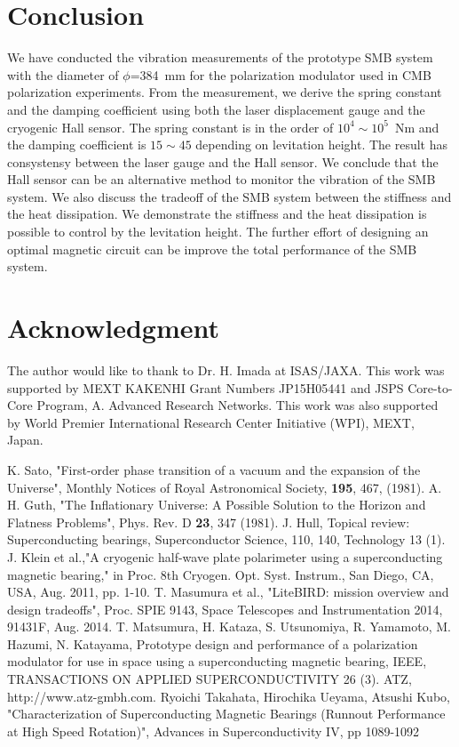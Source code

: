 \documentclass[a4paper]{jpconf}
\begin{document}
\section*{Conclusion}
We have conducted the vibration measurements of the prototype SMB system with the diameter of $\phi$=384~mm for the polarization modulator used in CMB polarization experiments.
From the measurement, we derive the spring constant and the damping coefficient using both the laser displacement gauge and the cryogenic Hall sensor.
The spring constant is in the order of $10^{4} \sim 10^{5}$~Nm and the damping coefficient is $15\sim45$ depending on levitation height.
The result has consystensy between the laser gauge and the Hall sensor.
We conclude that the Hall sensor can be an alternative method to monitor the vibration of the SMB system.
We also discuss the tradeoff of the SMB system between the stiffness and the heat dissipation.
We demonstrate the stiffness and the heat dissipation is possible to control by the levitation height.
The further effort of designing an optimal magnetic circuit can be improve the total performance of the SMB system.

\section*{Acknowledgment}
The author would like to thank to Dr. H. Imada at ISAS/JAXA.
This work was supported by MEXT KAKENHI Grant Numbers JP15H05441 and JSPS Core-to-Core Program, A. Advanced Research Networks.
This work was also supported by World Premier International Research Center Initiative (WPI), MEXT, Japan.


\vspace*{5mm}
\begin{thebibliography}{99}

 K. Sato, "First-order phase transition of a vacuum and the expansion of the Universe", Monthly Notices of Royal Astronomical Society, {\bf 195}, 467, (1981).
A. H. Guth, "The Inflationary Universe: A Possible Solution to the Horizon and Flatness Problems", Phys. Rev. D {\bf 23}, 347 (1981).
J. Hull, Topical review: Superconducting bearings, Superconductor Science, 110, 140, Technology 13 (1).
J. Klein et al.,"A cryogenic half-wave plate polarimeter using a superconducting magnetic bearing," in Proc. 8th Cryogen. Opt. Syst. Instrum., San Diego, CA, USA, Aug. 2011, pp. 1-10.
T. Masumura et al., "LiteBIRD: mission overview and design tradeoffs", Proc. SPIE 9143, Space Telescopes and Instrumentation 2014, 91431F, Aug. 2014.
T. Matsumura, H. Kataza, S. Utsunomiya, R. Yamamoto, M. Hazumi, N. Katayama, Prototype design and performance of a polarization modulator for use in space using a superconducting magnetic bearing, IEEE, TRANSACTIONS ON APPLIED SUPERCONDUCTIVITY 26 (3).
ATZ, http://www.atz-gmbh.com.
Ryoichi Takahata, Hirochika Ueyama, Atsushi Kubo, "Characterization of Superconducting Magnetic Bearings (Runnout Performance at High Speed Rotation)", Advances in Superconductivity IV, pp 1089-1092

\end{thebibliography}
\end{document}

